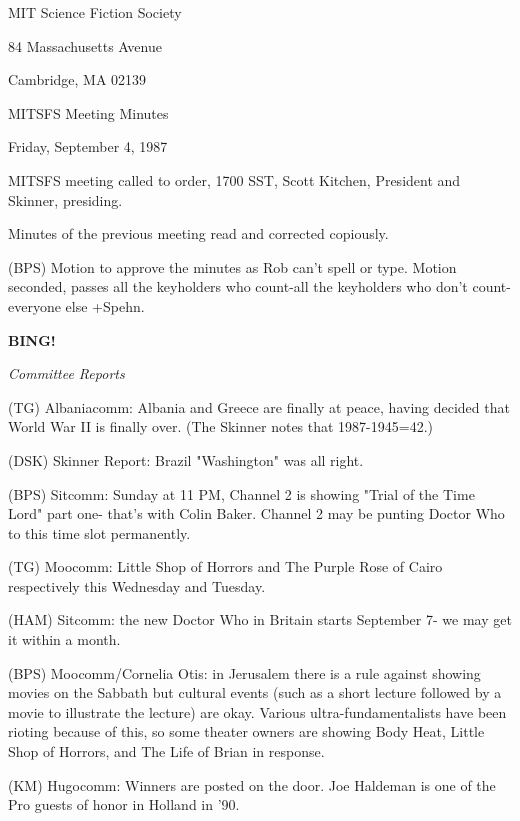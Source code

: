 \documentclass[12pt]{article}
\newcommand{\bing}{{\bf BING!} }
\newcommand{\goto}[1]{\bing \vskip 12pt \centerline{{\em{#1}}}}
\begin{document}
\begin{center}

MIT Science Fiction Society 

84 Massachusetts Avenue

Cambridge, MA 02139

\vspace{12pt}

MITSFS Meeting Minutes 

Friday, September 4, 1987

\end{center}
 
\vspace{18pt}

\setlength{\parskip}{6pt}

\noindent
MITSFS meeting called to order, 1700 SST, Scott Kitchen, President and Skinner, presiding.

Minutes of the previous meeting read and corrected copiously.

(BPS) Motion to approve the minutes as Rob can't spell or type. Motion seconded, passes all the keyholders who count-all the keyholders who don't count-everyone else +Spehn.

\goto{Committee Reports}

(TG) Albaniacomm: Albania and Greece are finally at peace, having decided that World War II is finally over. (The Skinner notes that 1987-1945=42.)

(DSK) Skinner Report: Brazil "Washington" was all right.

(BPS) Sitcomm: Sunday at 11 PM, Channel 2 is showing "Trial of the Time Lord" part one- that's with Colin Baker. Channel 2 may be punting Doctor Who to this time slot permanently.

(TG) Moocomm: Little Shop of Horrors and The Purple Rose of Cairo respectively this Wednesday and Tuesday.

(HAM) Sitcomm: the new Doctor Who in Britain starts September 7- we may get it within a month.

(BPS) Moocomm/Cornelia Otis: in Jerusalem there is a rule against showing movies on the Sabbath but cultural events (such as a short lecture followed by a movie to illustrate the lecture) are okay. Various ultra-fundamentalists have been rioting because of this, so some theater owners are showing Body Heat, Little Shop of Horrors, and The Life of Brian in response.

(KM) Hugocomm: Winners are posted on the door. Joe Haldeman is one of the Pro guests of honor in Holland in '90.
\end{document}
